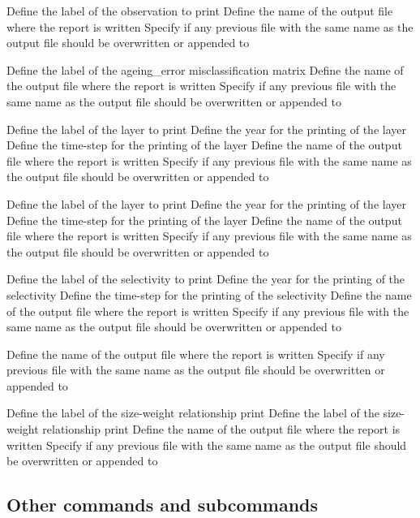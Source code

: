  {Define the label of the observation to print}
 {Define the name of the output file where the report is written}
 {Specify if any previous file with the same name as the output file should be overwritten or appended to}
\par\textbf{}\par
{} {Define the label of the ageing\_error misclassification matrix}
 {Define the name of the output file where the report is written}
 {Specify if any previous file with the same name as the output file should be overwritten or appended to}
\par\textbf{}\par
{} {Define the label of the layer to print}
 {Define the year for the printing of the layer}
 {Define the time-step for the printing of the layer}
 {Define the name of the output file where the report is written}
 {Specify if any previous file with the same name as the output file should be overwritten or appended to}
\par\textbf{}\par
{} {Define the label of the layer to print}
 {Define the year for the printing of the layer}
 {Define the time-step for the printing of the layer}
 {Define the name of the output file where the report is written}
 {Specify if any previous file with the same name as the output file should be overwritten or appended to}
\par\textbf{}\par
{} {Define the label of the selectivity to print}
 {Define the year for the printing of the selectivity}
 {Define the time-step for the printing of the selectivity}
 {Define the name of the output file where the report is written}
 {Specify if any previous file with the same name as the output file should be overwritten or appended to}
\par\textbf{}\par
{} {Define the name of the output file where the report is written}
 {Specify if any previous file with the same name as the output file should be overwritten or appended to}
\par\textbf{}\par
{} {Define the label of the size-weight relationship print}
 {Define the label of the size-weight relationship print}
 {Define the name of the output file where the report is written}
 {Specify if any previous file with the same name as the output file should be overwritten or appended to}
\subsection{Other commands and subcommands}\par
{}\par\par
